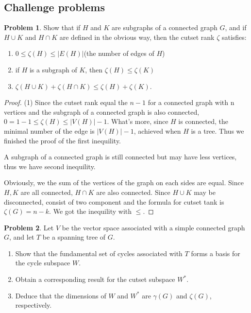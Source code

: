 \documentclass[a4paper,11pt]{article}%
\theoremstyle{remark}
\theoremstyle{definition}
\newtheorem{problem}{Problem}[subsection]
\newcommand*{\abs}[1]{\lvert #1 \rvert}
\begin{document}
\subsection{Challenge problems}
\begin{problem}
   Show that if $H$ and $K$ are subgraphs of a connected graph $G$, and if $H\cup K$ and $H\cap K$ are defined in the obvious way, then 
   the cutset rank $\zeta$ satisfies:
   \begin{enumerate}
    \item $0\leq\zeta(H)\leq\abs{E(H)}$(the number of edges of $H$)
    \item if $H$ is a subgraph of $K$, then $\zeta(H)\leq\zeta(K)$
    \item $\zeta(H\cup K)+\zeta(H\cap K)\leq\zeta(H)+\zeta(K)$.
   \end{enumerate} 
   \begin{proof}
   (1) Since the cutset rank equal the $n-1$ for a connected graph with n vertices and the subgraph of a connected graph is also connected,
   $0=1-1\leq\zeta(H)\leq\abs{V(H)}-1$. What's more, since $H$ is connected, the minimal number of the edge is $\abs{V(H)}-1$, 
   achieved when $H$ is a tree. Thus we finished the proof of the first inequility. 

   A subgraph of a connected graph is still connected but may have less vertices, thus we have second inequility.

   Obviously, we the sum of the vertices of the graph on each sides are equal. Since $H,K$ are all 
   connected, $H\cap K$ are also connected. Since $H\cup K$ may be disconnected, consist of two component and 
   the formula for cutset tank is $\zeta(G)=n-k$. We got the inequility with $\leq$.
   \end{proof}
\end{problem}
\begin{problem}
    Let $V$ be the vector space associated with a simple connected graph $G$, and let $T$ be a spanning tree of $G$.
    \begin{enumerate}
        \item Show that the fundamental set of cycles associated with $T$ forms a basis for the cycle subspace $W$.
        \item Obtain a corresponding result for the cutset subspace $W^*$.
        \item Deduce that the dimensions of $W$ and $W^*$ are $\gamma(G)$ and $\zeta(G)$, respectively.
    \end{enumerate}
\end{problem}
\end{document}
